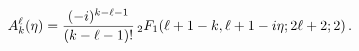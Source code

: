 \[A_{k}^{\ell}(\eta)=\dfrac{(-i)^{k-\ell-1}}{(k-\ell-1)!}\*\mathop{{{}_{2}F_{1}}%
\/}\nolimits\!\left(\ell+1-k,\ell+1-i\eta;2\ell+2;2\right).\]